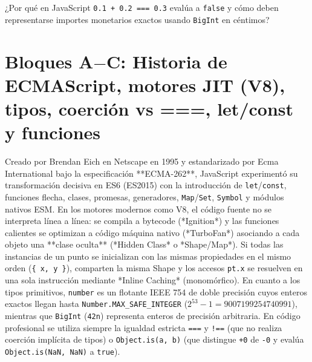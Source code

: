 \documentclass{book}
\begin{document}
\begin{tcolorbox}[title={Autoficha}, studiumcheck, breakable]

¿Por qué en JavaScript \texttt{0.1 + 0.2 === 0.3} evalúa a \texttt{false} y cómo deben representarse importes monetarios exactos usando \texttt{BigInt} en céntimos?
\end{tcolorbox}

\section{Bloques A\(-\)C: Historia de ECMAScript, motores JIT (V8), tipos, coerción vs ===, let/const y funciones}

Creado por Brendan Eich en Netscape en 1995 y estandarizado por Ecma International bajo la especificación **ECMA-262**, JavaScript experimentó su transformación decisiva en ES6 (ES2015) con la introducción de \texttt{let}/\texttt{const}, funciones flecha, clases, promesas, generadores, \texttt{Map}/\texttt{Set}, \texttt{Symbol} y módulos nativos ESM. En los motores modernos como V8, el código fuente no se interpreta línea a línea: se compila a bytecode (*Ignition*) y las funciones calientes se optimizan a código máquina nativo (*TurboFan*) asociando a cada objeto una **clase oculta** (*Hidden Class* o *Shape/Map*). Si todas las instancias de un punto se inicializan con las mismas propiedades en el mismo orden (\texttt{\{ x, y \}}), comparten la misma Shape y los accesos \texttt{pt.x} se resuelven en una sola instrucción mediante *Inline Caching* (monomórfico). En cuanto a los tipos primitivos, \texttt{number} es un flotante IEEE 754 de doble precisión cuyos enteros exactos llegan hasta \texttt{Number.MAX\_SAFE\_INTEGER} (\(2^{53} - 1 = 9007199254740991\)), mientras que \texttt{BigInt} (\texttt{42n}) representa enteros de precisión arbitraria. En código profesional se utiliza siempre la igualdad estricta \texttt{===} y \texttt{!==} (que no realiza coerción implícita de tipos) o \texttt{Object.is(a, b)} (que distingue \texttt{+0} de \texttt{-0} y evalúa \texttt{Object.is(NaN, NaN)} a \texttt{true}).
\end{document}
